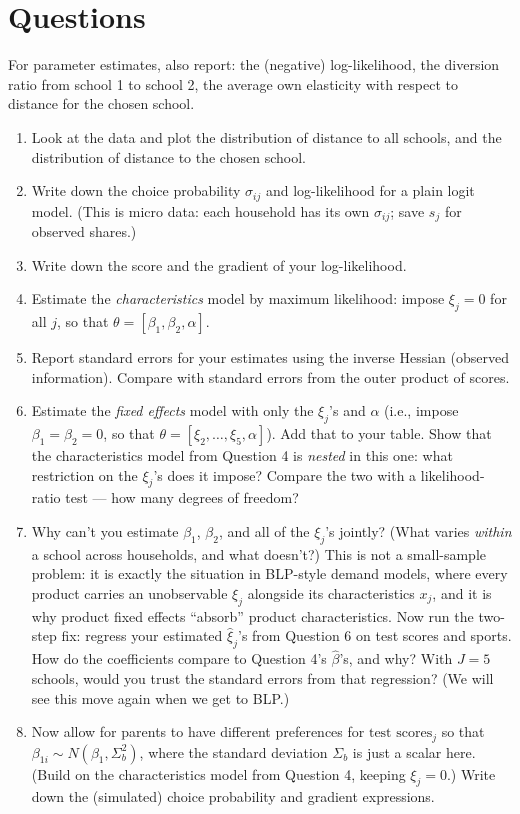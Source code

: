 \documentclass{article}
\begin{document}
\section*{\normalsize Questions}
For parameter estimates, also report: the (negative) log-likelihood, the diversion ratio from school 1 to school 2, the average own elasticity with respect to distance for the chosen school.
\begin{enumerate}
	\item Look at the data and plot the distribution of distance to all schools, and the distribution of distance to the chosen school.
	\item Write down the choice probability $\sigma_{ij}$ and log-likelihood for a plain logit model. (This is micro data: each household has its own $\sigma_{ij}$; save $s_j$ for observed shares.)
	\item Write down the score and the gradient of your log-likelihood.
	\item Estimate the \emph{characteristics} model by maximum likelihood: impose $\xi_j = 0$ for all $j$, so that $\theta = [\beta_1,\beta_2,\alpha]$.
	\item Report standard errors for your estimates using the inverse Hessian (observed information). Compare with standard errors from the outer product of scores.
	\item Estimate the \emph{fixed effects} model with only the $\xi_j$'s and $\alpha$ (i.e., impose $\beta_1=\beta_2=0$, so that $\theta = [\xi_2,\ldots,\xi_5,\alpha]$). Add that to your table. Show that the characteristics model from Question 4 is \emph{nested} in this one: what restriction on the $\xi_j$'s does it impose? Compare the two with a likelihood-ratio test --- how many degrees of freedom?
	\item \label{q:ident} Why can't you estimate $\beta_1$, $\beta_2$, and all of the $\xi_j$'s jointly? (What varies \emph{within} a school across households, and what doesn't?) This is not a small-sample problem: it is exactly the situation in BLP-style demand models, where every product carries an unobservable $\xi_j$ alongside its characteristics $x_j$, and it is why product fixed effects ``absorb'' product characteristics. Now run the two-step fix: regress your estimated $\widehat{\xi}_j$'s from Question 6 on test scores and sports. How do the coefficients compare to Question 4's $\widehat{\beta}$'s, and why? With $J=5$ schools, would you trust the standard errors from that regression? (We will see this move again when we get to BLP.)
	\item Now allow for parents to have different preferences for $ \text{test scores}_j$ so that $\beta_{1i}\sim N(\beta_1,\Sigma_b^2)$, where the standard deviation $\Sigma_b$ is just a scalar here. (Build on the characteristics model from Question 4, keeping $\xi_j = 0$.) Write down the (simulated) choice probability and gradient expressions.


\end{enumerate}
\end{document}
